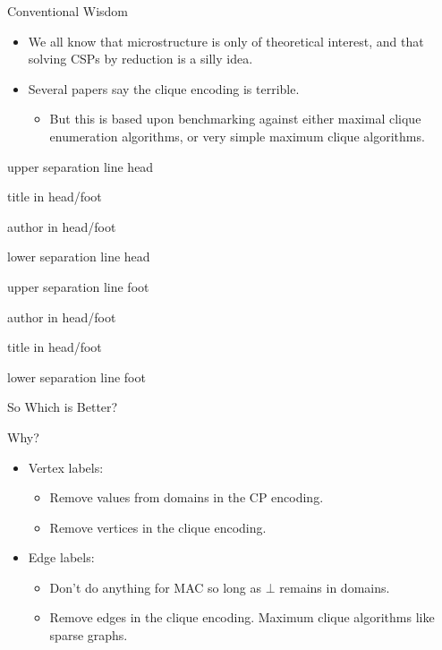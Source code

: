 \documentclass{beamer}
\makeatletter
\newenvironment{nearlyplainframe}[2][]{
    \def\beamer@entrycode{\vspace*{-\headheight}\vspace*{3pt}}
    \setbeamertemplate{headline}
    {%
        \begin{beamercolorbox}[colsep=1.5pt]{upper separation line head}
        \end{beamercolorbox}
        \begin{beamercolorbox}[ht=0.5ex,dp=0.125ex,%
            leftskip=.3cm,rightskip=.3cm plus1fil]{title in head/foot}%
        \end{beamercolorbox}%
        \begin{beamercolorbox}[ht=0.5ex,dp=0.125ex,%
            leftskip=.3cm,rightskip=.3cm plus1fil]{author in head/foot}%
        \end{beamercolorbox}%
        \begin{beamercolorbox}[colsep=1.5pt]{lower separation line head}
        \end{beamercolorbox}
        \vspace*{\headheight}
    }

    \setbeamertemplate{footline}
    {%
        \begin{beamercolorbox}[colsep=1.5pt]{upper separation line foot}
        \end{beamercolorbox}
        \begin{beamercolorbox}[ht=0.5ex,dp=0.125ex,%
            leftskip=.3cm,rightskip=.3cm plus1fil]{author in head/foot}%
        \end{beamercolorbox}%
        \begin{beamercolorbox}[ht=0.5ex,dp=0.125ex,%
            leftskip=.3cm,rightskip=.3cm plus1fil]{title in head/foot}%
        \end{beamercolorbox}%
        \begin{beamercolorbox}[colsep=1.5pt]{lower separation line foot}
        \end{beamercolorbox}
    }

    \begin{frame}[#1]{#2}
    }{
    \end{frame}
}
\makeatother
\begin{document}
\begin{frame}{Conventional Wisdom}
    \begin{itemize}
        \item We all know that microstructure is only of theoretical interest, and that solving CSPs
            by reduction is a silly idea.
        \item Several papers say the clique encoding is terrible.
            \begin{itemize}
                \item But this is based upon benchmarking against either maximal clique enumeration
                    algorithms, or very simple maximum clique algorithms.
            \end{itemize}
    \end{itemize}
\end{frame}

\begin{nearlyplainframe}[t]{So Which is Better?}



\end{nearlyplainframe}

\begin{frame}{Why?}
    \begin{itemize}
        \item Vertex labels:
            \begin{itemize}
                \item Remove values from domains in the CP encoding.
                \item Remove vertices in the clique encoding.
            \end{itemize}
        \item Edge labels:
            \begin{itemize}
                \item Don't do anything for MAC so long as $\bot$ remains in domains.

                \item Remove edges in the clique encoding. Maximum clique algorithms like sparse
                    graphs.
            \end{itemize}
    \end{itemize}
\end{frame}
\end{document}
